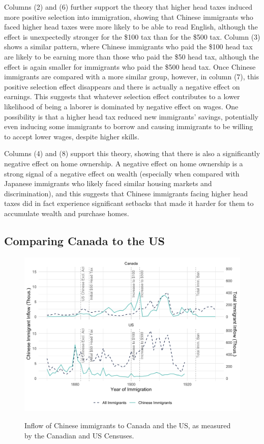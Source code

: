 \documentclass[12pt]{article}
\begin{document}
Columns (2) and (6) further support the theory that higher head taxes induced more positive selection into immigration, showing that Chinese immigrants who faced higher head taxes were more likely to be able to read English, although the effect is unexpectedly stronger for the \$100 tax than for the \$500 tax. Column (3) shows a similar pattern, where Chinese immigrants who paid the \$100 head tax are likely to be earning more than those who paid the \$50 head tax, although the effect is again smaller for immigrants who paid the \$500 head tax. Once Chinese immigrants are compared with a more similar group, however, in column (7), this positive selection effect disappears and there is actually a negative effect on earnings. This suggests that whatever selection effect contributes to a lower likelihood of being a laborer is dominated by negative effect on wages. 
One possibility is that a higher head tax reduced new immigrants' savings, potentially even inducing some immigrants to borrow and causing immigrants to be willing to accept lower wages, despite higher skills.

Columns (4) and (8) support this theory, showing that there is also a significantly negative effect on home ownership. A negative effect on home ownership is a strong signal of a negative effect on wealth (especially when compared with Japanese immigrants who likely faced similar housing markets and discrimination), and this suggests that Chinese immigrants facing higher head taxes did in fact experience significant setbacks that made it harder for them to accumulate wealth and purchase homes.

\subsection{Comparing Canada to the US}

\begin{figure}
    \centering 
    \caption{Inflow of Chinese immigrants to Canada and the US, as measured by the Canadian and US Censuses.}
    \includegraphics[width=\textwidth]{../../figs/fig3_us_can.png}
    \label{fig:taxpaid}
\end{figure}
\end{document}
